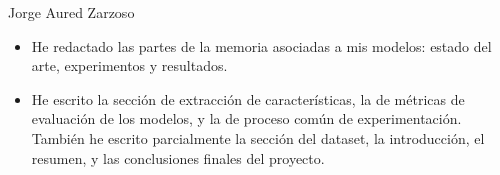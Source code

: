 \begin{contribucion}{Jorge Aured Zarzoso}
\begin{itemize}
	\item He redactado las partes de la memoria asociadas a mis modelos: estado del arte, experimentos y resultados.
	
	\item He escrito la sección de extracción de características, la de métricas de evaluación de los modelos, y la de proceso común de experimentación. También he escrito parcialmente la sección del dataset, la introducción, el resumen, y las conclusiones finales del proyecto.

\end{itemize}
\end{contribucion}